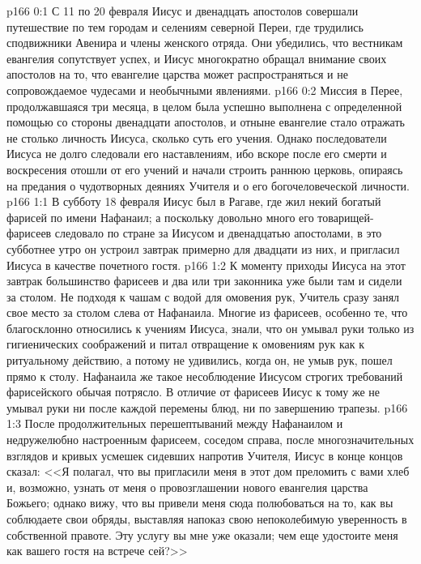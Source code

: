 \vs p166 0:1 С 11 по 20 февраля Иисус и двенадцать апостолов совершали путешествие по тем городам и селениям северной Переи, где трудились сподвижники Авенира и члены женского отряда. Они убедились, что вестникам евангелия сопутствует успех, и Иисус многократно обращал внимание своих апостолов на то, что евангелие царства может распространяться и не сопровождаемое чудесами и необычными явлениями.
\vs p166 0:2 Миссия в Перее, продолжавшаяся три месяца, в целом была успешно выполнена с определенной помощью со стороны двенадцати апостолов, и отныне евангелие стало отражать не столько личность Иисуса, сколько суть его учения. Однако последователи Иисуса не долго следовали его наставлениям, ибо вскоре после его смерти и воскресения отошли от его учений и начали строить раннюю церковь, опираясь на предания о чудотворных деяниях Учителя и о его богочеловеческой личности.
\vs p166 1:1 В субботу 18 февраля Иисус был в Рагаве, где жил некий богатый фарисей по имени Нафанаил; а поскольку довольно много его товарищей\hyp{}фарисеев следовало по стране за Иисусом и двенадцатью апостолами, в это субботнее утро он устроил завтрак примерно для двадцати из них, и пригласил Иисуса в качестве почетного гостя.
\vs p166 1:2 К моменту приходы Иисуса на этот завтрак большинство фарисеев и два или три законника уже были там и сидели за столом. Не подходя к чашам с водой для омовения рук, Учитель сразу занял свое место за столом слева от Нафанаила. Многие из фарисеев, особенно те, что благосклонно относились к учениям Иисуса, знали, что он умывал руки только из гигиенических соображений и питал отвращение к омовениям рук как к ритуальному действию, а потому не удивились, когда он, не умыв рук, пошел прямо к столу. Нафанаила же такое несоблюдение Иисусом строгих требований фарисейского обычая потрясло. В отличие от фарисеев Иисус к тому же не умывал руки ни после каждой перемены блюд, ни по завершению трапезы.
\vs p166 1:3 После продолжительных перешептываний между Нафанаилом и недружелюбно настроенным фарисеем, соседом справа, после многозначительных взглядов и кривых усмешек сидевших напротив Учителя, Иисус в конце концов сказал: <<Я полагал, что вы пригласили меня в этот дом преломить с вами хлеб и, возможно, узнать от меня о провозглашении нового евангелия царства Божьего; однако вижу, что вы привели меня сюда полюбоваться на то, как вы соблюдаете свои обряды, выставляя напоказ свою непоколебимую уверенность в собственной правоте. Эту услугу вы мне уже оказали; чем еще удостоите меня как вашего гостя на встрече сей?>>
